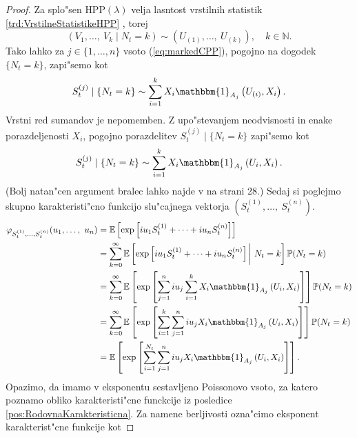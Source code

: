 \documentclass[12pt, a4paper, reqno]{amsart}
\theoremstyle{definition}
\theoremstyle{plain}
\newcommand{\N}{\mathbb{N}}
\newcommand{\E}{\mathbb{E}}
\newcommand{\Prob}{\mathbb{P}}
\newcommand{\1}{\mathds{1}}
\newcommand*{\refPriloga}[1]{%
  \begingroup
    \hypersetup{
      linkcolor=red,
      linkbordercolor=red,
    }%
    \ref{#1}%
  \endgroup
}
\begin{document}
        \begin{proof}
            Za splo"sen $\text{HPP}(\lambda)$ velja lasntost vrstilnih statistik \refPriloga{trd:VrstilneStatistikeHPP},
            torej
            \begin{equation*}
                \left(V_1, \dots, \ V_k \mid N_t = k\right)\sim \left(U_{(1)}, \dots, \ U_{(k)}\right), \quad k\in\N.
            \end{equation*}
            Tako lahko za $j\in\{1, \dots, n\}$ vsoto (\ref{eq:markedCPP}), pogojno na dogodek $\{N_t = k\}$, zapi"semo kot
            \begin{equation*}
                S_t^{(j)}\mid \{N_t = k\} \sim \sum_{i=1}^{k}X_i\mathbbm{1}_{A_j}\left(U_{(i)}, X_i\right).
            \end{equation*}
            Vrstni red sumandov je nepomemben. Z upo"stevanjem neodvisnosti in enake 
            porazdeljenosti $X_i$, pogojno porazdelitev $S_t^{(j)}\mid \{N_t = k\} $ zapi"semo kot 
            \begin{equation*}
                S_t^{(j)}\mid \{N_t = k\} \sim \sum_{i=1}^{k}X_i\mathbbm{1}_{A_j}\left(U_{i}, X_i\right).
            \end{equation*}
            (Bolj natan"cen argument bralec lahko najde v \cite{4} na strani 28.)
            Sedaj si poglejmo skupno karakteristi"cno funkcijo slu"cajnega vektorja
            $(S_t^{(1)}, \dots, \ S_t^{(n)})$.
            \begin{align*}
                \varphi_{S_t^{(1)},\dots, S_t^{(n)}}(u_1, \dots, \ u_n) 
                    &= \E\left[\exp\left[iu_1S_t^{(1)} + \dots + iu_nS_t^{(n)}\right]\right] \\
                    &= \sum_{k =0}^\infty \E\left[\exp\left[iu_1S_t^{(1)} + \dots + iu_nS_t^{(n)}\right]\bigg| \ N_t = k\right]\Prob(N_t = k)\\
                    &= \sum_{k=0}^\infty \E\left[\exp\left[\sum_{j=1}^niu_j\sum_{i=1}^kX_i\mathbbm{1}_{A_j}\left(U_i, X_i\right)\right]\right]\Prob(N_t = k)\\
                    &= \sum_{k=0}^\infty \E\left[\exp\left[\sum_{i=1}^k\sum_{j=1}^niu_jX_i\mathbbm{1}_{A_j}\left(U_i, X_i\right)\right]\right]\Prob(N_t = k)\\
                    &= \E\left[\exp\left[\sum_{i=1}^{N_t}\sum_{j=1}^niu_jX_i\mathbbm{1}_{A_j}\left(U_i, X_i\right)\right]\right]. 
            \end{align*}
            Opazimo, da imamo v eksponentu sestavljeno Poissonovo vsoto, za katero poznamo obliko karakteristi"cne 
            funckcije iz posledice \ref{pos:RodovnaKarakteristicna}. Za namene berljivosti ozna"cimo 
            eksponent karakterist"cne funkcije kot


\end{proof}
\end{document}
